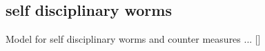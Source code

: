 %
\subsection*{self disciplinary worms}
Model for self disciplinary worms and counter measures ... []  



